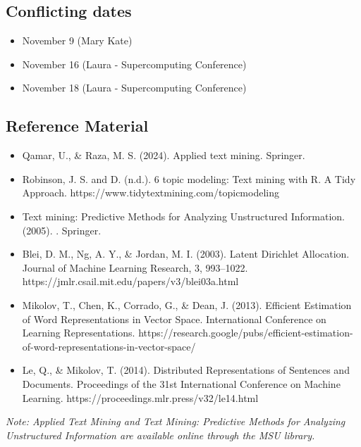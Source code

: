 \documentclass{article}
\begin{document}
\subsection*{Conflicting dates}
\begin{itemize}[leftmargin =1.5em]
    \item November 9 (Mary Kate)
    \item November 16 (Laura - Supercomputing Conference)
    \item November 18 (Laura - Supercomputing Conference)
\end{itemize}

\subsection*{Reference Material}
\begin{itemize}
    \item Qamar, U., \& Raza, M. S. (2024). Applied text mining. Springer. 
    \item Robinson, J. S. and D. (n.d.). 6 topic modeling: Text mining with R. A Tidy Approach. https://www.tidytextmining.com/topicmodeling 
    \item Text mining: Predictive Methods for Analyzing Unstructured Information. (2005). . Springer. 
    \item Blei, D. M., Ng, A. Y., \& Jordan, M. I. (2003).
Latent Dirichlet Allocation. Journal of Machine Learning Research, 3, 993--1022.
https://jmlr.csail.mit.edu/papers/v3/blei03a.html
\item Mikolov, T., Chen, K., Corrado, G., \& Dean, J. (2013).
Efficient Estimation of Word Representations in Vector Space.
International Conference on Learning Representations.
https://research.google/pubs/efficient-estimation-of-word-representations-in-vector-space/
\item Le, Q., \& Mikolov, T. (2014).
Distributed Representations of Sentences and Documents.
Proceedings of the 31st International Conference on Machine Learning.
https://proceedings.mlr.press/v32/le14.html
\end{itemize}

\textit{Note: Applied Text Mining and Text Mining: Predictive Methods for Analyzing Unstructured Information are available online through the MSU library.}
\end{document}

